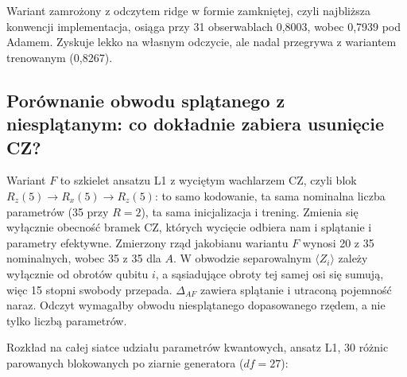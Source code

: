 \documentclass[11pt, a4paper]{article}
\begin{document}
Wariant zamrożony z odczytem ridge w formie zamkniętej, czyli najbliższa konwencji implementacja, osiąga przy 31 obserwablach 0,8003, wobec 0,7939 pod Adamem. Zyskuje lekko na własnym odczycie, ale nadal przegrywa z wariantem trenowanym (0,8267).
\subsection{Porównanie obwodu splątanego z niesplątanym: co dokładnie zabiera usunięcie CZ?}\label{sec:splatanie}

Wariant $F$ to szkielet ansatzu L1 z wyciętym wachlarzem CZ, czyli blok $R_z(5) \to R_x(5) \to R_z(5)$: to samo kodowanie, ta sama nominalna liczba parametrów (35 przy $R = 2$), ta sama inicjalizacja i trening. Zmienia się wyłącznie obecność bramek CZ, których wycięcie odbiera nam i splątanie i parametry efektywne. Zmierzony rząd jakobianu wariantu $F$ wynosi 20 z 35 nominalnych, wobec 35 z 35 dla $A$. W obwodzie separowalnym $\langle Z_i \rangle$ zależy wyłącznie od obrotów qubitu $i$, a sąsiadujące obroty tej samej osi się sumują, więc 15 stopni swobody przepada. $\Delta_{AF}$ zawiera splątanie i utraconą pojemność naraz. Odczyt wymagałby obwodu niesplątanego dopasowanego rzędem, a nie tylko liczbą parametrów.


Rozkład na całej siatce udziału parametrów kwantowych, ansatz L1, 30 różnic parowanych blokowanych po ziarnie generatora ($df = 27$):
\end{document}
